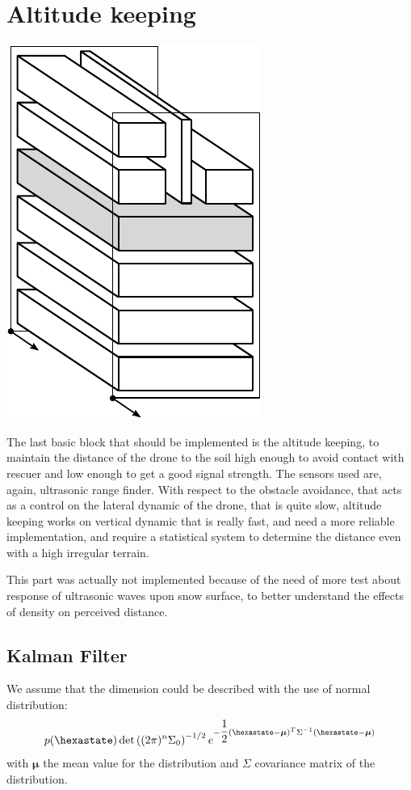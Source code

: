\section{Altitude keeping}
\begin{marginfigure}
	\centering
	\includegraphics[scale=0.5]{ch3/img/PA_map_altitude.pdf}
\end{marginfigure}
The last basic block that should be implemented is the altitude keeping, to maintain the distance of the drone to the soil high enough to avoid contact with rescuer and low enough to get a good signal strength. The sensors used are, again, ultrasonic range finder. With respect to the obstacle avoidance, that acts as a control on the lateral dynamic of the drone, that is quite slow, altitude keeping works on vertical dynamic that is really fast, and need a more reliable implementation, and require a statistical system to determine the distance even with a high irregular terrain.

This part was actually not implemented because of the need of more test about response of ultrasonic waves upon snow surface, to better understand the effects of density on perceived distance.

\subsection{Kalman Filter}
We assume that the dimension could be described with the use of normal distribution:
\begin{equation}
p(\hexastate) \det\braces{(2\pi)^{n}\Sigma_0}^{-1/2} e^{-\dfrac{1}{2}\braces{\hexastate - \boldsymbol{\mu}}^T \Sigma^{-1}\braces{\hexastate - \boldsymbol{\mu}}}
\end{equation}
with ${\boldsymbol{\mu}}$ the mean value for the distribution and ${\Sigma}$ covariance matrix of the distribution.

